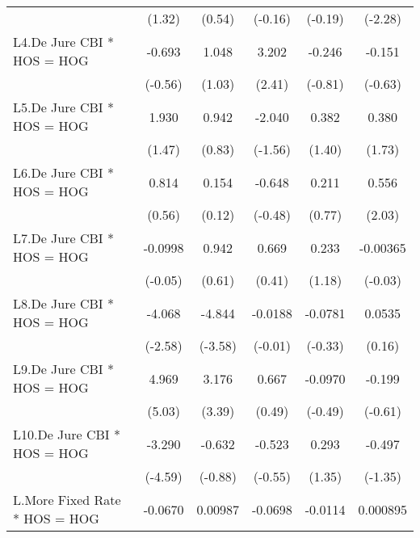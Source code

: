 {\begin{longtable}{l*{5}{c}}
                &   (1.32)         &   (0.54)         &  (-0.16)         &  (-0.19)         &  (-2.28)         \\
\addlinespace
L4.De Jure CBI * HOS = HOG&   -0.693         &    1.048         &    3.202\sym{*}  &   -0.246         &   -0.151         \\
                &  (-0.56)         &   (1.03)         &   (2.41)         &  (-0.81)         &  (-0.63)         \\
\addlinespace
L5.De Jure CBI * HOS = HOG&    1.930         &    0.942         &   -2.040         &    0.382         &    0.380         \\
                &   (1.47)         &   (0.83)         &  (-1.56)         &   (1.40)         &   (1.73)         \\
\addlinespace
L6.De Jure CBI * HOS = HOG&    0.814         &    0.154         &   -0.648         &    0.211         &    0.556\sym{*}  \\
                &   (0.56)         &   (0.12)         &  (-0.48)         &   (0.77)         &   (2.03)         \\
\addlinespace
L7.De Jure CBI * HOS = HOG&  -0.0998         &    0.942         &    0.669         &    0.233         & -0.00365         \\
                &  (-0.05)         &   (0.61)         &   (0.41)         &   (1.18)         &  (-0.03)         \\
\addlinespace
L8.De Jure CBI * HOS = HOG&   -4.068\sym{*}  &   -4.844\sym{***}&  -0.0188         &  -0.0781         &   0.0535         \\
                &  (-2.58)         &  (-3.58)         &  (-0.01)         &  (-0.33)         &   (0.16)         \\
\addlinespace
L9.De Jure CBI * HOS = HOG&    4.969\sym{***}&    3.176\sym{***}&    0.667         &  -0.0970         &   -0.199         \\
                &   (5.03)         &   (3.39)         &   (0.49)         &  (-0.49)         &  (-0.61)         \\
\addlinespace
L10.De Jure CBI * HOS = HOG&   -3.290\sym{***}&   -0.632         &   -0.523         &    0.293         &   -0.497         \\
                &  (-4.59)         &  (-0.88)         &  (-0.55)         &   (1.35)         &  (-1.35)         \\
\addlinespace
L.More Fixed Rate * HOS = HOG&  -0.0670         &  0.00987         &  -0.0698         &  -0.0114         & 0.000895         \\

\end{longtable}}
